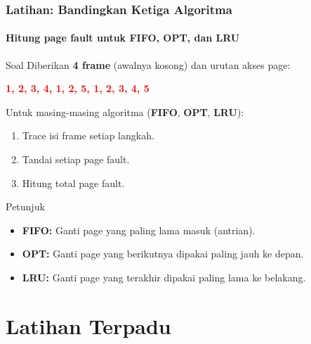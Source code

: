 \documentclass[t,aspectratio=169,xcolor=dvipsnames]{beamer}
\newcommand{\tem}[1]{\textbf{\textcolor{red}{#1}}}
\begin{document}
\begin{frame}
    \frametitle{Latihan: Bandingkan Ketiga Algoritma}
    \framesubtitle{Hitung page fault untuk FIFO, OPT, dan LRU}
    \scriptsize

    \begin{block}{Soal}
        Diberikan \textbf{4 frame} (awalnya kosong) dan urutan akses page:

        \vspace{0.1cm}
        \centering\tem{1, 2, 3, 4, 1, 2, 5, 1, 2, 3, 4, 5}
    \end{block}

    \vspace{0.15cm}
    Untuk masing-masing algoritma (\textbf{FIFO}, \textbf{OPT}, \textbf{LRU}):
    \begin{enumerate}
        \item Trace isi frame setiap langkah.
        \item Tandai setiap page fault.
        \item Hitung total page fault.
    \end{enumerate}

    \vspace{0.1cm}
    \begin{alertblock}{Petunjuk}
        \begin{itemize}
            \item \textbf{FIFO:} Ganti page yang paling lama masuk (antrian).
            \item \textbf{OPT:} Ganti page yang berikutnya dipakai paling jauh ke depan.
            \item \textbf{LRU:} Ganti page yang terakhir dipakai paling lama ke belakang.
        \end{itemize}
    \end{alertblock}
\end{frame}

\section{Latihan Terpadu}
\end{document}
